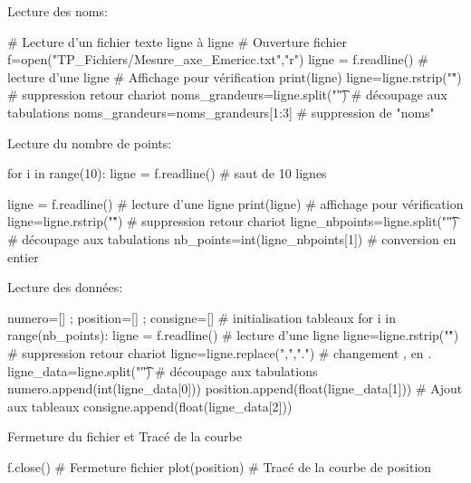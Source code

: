 \documentclass[10pt,fleqn]{article} %
\begin{document}
\begin{exemple}
\begin{minipage}[c]{.6\linewidth}
\end{minipage}




\begin{py}
Lecture des noms:
\begin{python}[h]
# Lecture d'un fichier texte ligne à ligne
# Ouverture fichier
f=open("TP_Fichiers/Mesure_axe_Emericc.txt","r")
ligne = f.readline()                  # lecture d'une ligne
# Affichage pour vérification
print(ligne)
ligne=ligne.rstrip("\n\r")            # suppression retour chariot
noms_grandeurs=ligne.split("\t")      # découpage aux tabulations
noms_grandeurs=noms_grandeurs[1:3]    # suppression de "noms"

\end{python}




Lecture du nombre de points:

\begin{python}[h]
for i in range(10):
    ligne = f.readline()  # saut de 10 lignes

ligne = f.readline()                  # lecture d'une ligne 
print(ligne)                    # affichage pour vérification
ligne=ligne.rstrip("\n\r")            # suppression retour chariot
ligne_nbpoints=ligne.split("\t")      # découpage aux tabulations
nb_points=int(ligne_nbpoints[1])      # conversion en entier
\end{python}

Lecture des données:

\begin{python}[h]

numero=[] ; position=[] ; consigne=[] # initialisation tableaux
for i in range(nb_points):
    ligne = f.readline()              # lecture d'une ligne 
    ligne=ligne.rstrip("\n\r")        # suppression retour chariot
    ligne=ligne.replace(",",".")      # changement , en .
    ligne_data=ligne.split("\t")      # découpage aux tabulations
    numero.append(int(ligne_data[0]))
    position.append(float(ligne_data[1]))    # Ajout aux tableaux
    consigne.append(float(ligne_data[2]))
\end{python}


Fermeture du fichier et Tracé de la courbe

\begin{python}[h]
f.close()        # Fermeture fichier
plot(position)   # Tracé de la courbe de position
\end{python}
\end{py}


\end{exemple}
\end{document}
